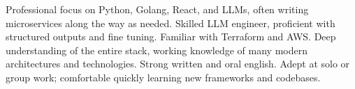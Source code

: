 

\begin{cvparagraph}

Professional focus on Python, Golang, React, and LLMs, often writing microservices along the way as needed. Skilled LLM engineer, proficient with structured outputs and fine tuning. Familiar with Terraform and AWS\@. Deep understanding of the entire stack, working knowledge of many modern architectures and technologies. Strong written and oral english. Adept at solo or group work; comfortable quickly learning new frameworks and codebases.
\end{cvparagraph}
